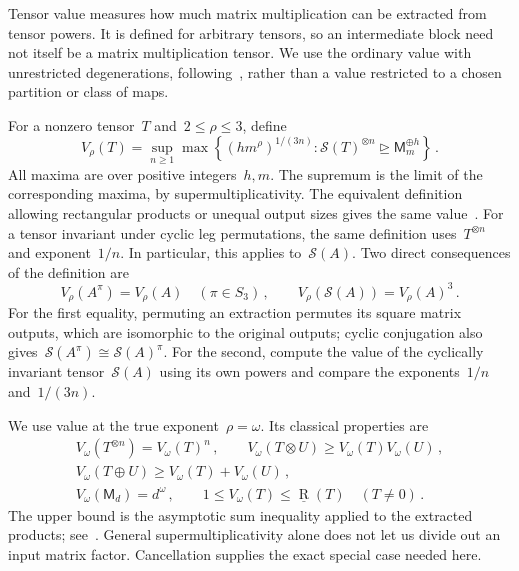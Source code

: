 \documentclass[11pt,letterpaper]{article}
\theoremstyle{definition}
\numberwithin{equation}{section}
\newcommand{\MM}{\mathsf M}
\newcommand{\br}{\underline{\operatorname{R}}}
\newcommand{\degen}{\unrhd}
\begin{document}
Tensor value measures how much matrix multiplication can be extracted from tensor powers. It is defined for arbitrary tensors, so an intermediate block need not itself be a matrix multiplication tensor. We use the ordinary value with unrestricted degenerations, following~\cite{Sto10,DS13,LG14,AFL15}, rather than a value restricted to a chosen partition or class of maps.

For a nonzero tensor~$T$ and~$2\leq\rho\leq3$, define
\begin{equation}\label{eq:value-definition}
 V_\rho(T)=\sup_{n\geq1}\max\left\{(hm^\rho)^{1/(3n)}:
 \mathcal S(T)^{\otimes n}\degen\MM_m^{\oplus h}\right\}\,.
\end{equation}
All maxima are over positive integers~$h,m$. The supremum is the limit of the corresponding maxima, by supermultiplicativity. The equivalent definition allowing rectangular products or unequal output sizes gives the same value~\cite[Section 3.2]{AFL15}. For a tensor invariant under cyclic leg permutations, the same definition uses~$T^{\otimes n}$ and exponent~$1/n$. In particular, this applies to~$\mathcal S(A)$. Two direct consequences of the definition are
\begin{equation}\label{eq:value-symmetry}
 V_\rho(A^\pi)=V_\rho(A)\quad(\pi\in S_3)\,,\qquad
 V_\rho(\mathcal S(A))=V_\rho(A)^3\,.
\end{equation}
For the first equality, permuting an extraction permutes its square matrix outputs, which are isomorphic to the original outputs; cyclic conjugation also gives~$\mathcal S(A^\pi)\cong\mathcal S(A)^\pi$. For the second, compute the value of the cyclically invariant tensor~$\mathcal S(A)$ using its own powers and compare the exponents~$1/n$ and~$1/(3n)$.

We use value at the true exponent~$\rho=\omega$. Its classical properties are
\begin{equation}\label{eq:value-properties}
 \begin{gathered}
 V_\omega(T^{\otimes n})=V_\omega(T)^n\,,\qquad
 V_\omega(T\otimes U)\geq V_\omega(T)V_\omega(U)\,,\\
 V_\omega(T\oplus U)\geq V_\omega(T)+V_\omega(U)\,,\\
 V_\omega(\MM_d)=d^\omega\,,\qquad
 1\leq V_\omega(T)\leq\br(T)\quad(T\ne0)\,.
 \end{gathered}
\end{equation}
The upper bound is the asymptotic sum inequality applied to the extracted products; see~\cite[Lemma 3.3]{AFL15}. General supermultiplicativity alone does not let us divide out an input matrix factor. Cancellation supplies the exact special case needed here.
\end{document}
